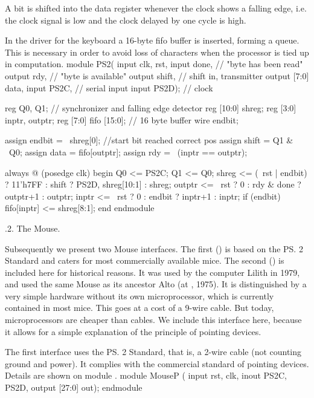 {A bit is shifted into the data register whenever the clock shows a falling edge, i.e. the clock signal  is low and the clock delayed by one cycle  is high.


In the driver for the keyboard a 16-byte fifo buffer is inserted, forming a queue. This is necessary in order to avoid loss of characters when the processor is tied up in computation.
\begintt
module PS2(
  input clk, rst,
  input done, // "byte has been read"
  output rdy, // "byte is available"
  output shift, // shift in, transmitter
  output [7:0] data,
  input PS2C, // serial input
  input PS2D); // clock
  
reg Q0, Q1; // synchronizer and falling edge detector
reg [10:0] shreg;
reg [3:0] inptr, outptr;
reg [7:0] fifo [15:0]; // 16 byte buffer
wire endbit;

assign endbit = ~shreg[0]; //start bit reached correct pos
assign shift = Q1 & ~Q0;
assign data = fifo[outptr];
assign rdy = ~(inptr == outptr);

always @ (posedge clk) begin
  Q0 <= PS2C; Q1 <= Q0;
  shreg <= (~rst | endbit) ? 11'h7FF :
    shift ? {PS2D, shreg[10:1]} : shreg;
  outptr <= ~rst ? 0 : rdy & done ? outptr+1 : outptr;
  inptr <= ~rst ? 0 : endbit ? inptr+1 : inptr;
  if (endbit) fifo[inptr] <= shreg[8:1];
end
endmodule
\endtt

.2. The Mouse.

Subsequently we present two Mouse interfaces. The first () is based on the \ps2 Standard and caters for most commercially available mice. The second () is included here for historical reasons. It was used by the computer Lilith in 1979, and used the same Mouse as its ancestor Alto (at , 1975). It is distinguished by a very simple hardware without its own microprocessor, which is currently contained in most mice. This goes at a cost of a 9-wire cable. But today, microprocessors are cheaper than cables. We include this interface here, because it allows for a simple explanation of the principle of pointing devices.

The first interface uses the \ps2 Standard, that is, a 2-wire cable (not counting ground and power). It complies with the commercial standard of pointing devices. Details are shown on module .
\begintt
module MouseP (
  input rst, clk,
  inout PS2C, PS2D,
  output [27:0] out);
endmodule
\endtt

}
